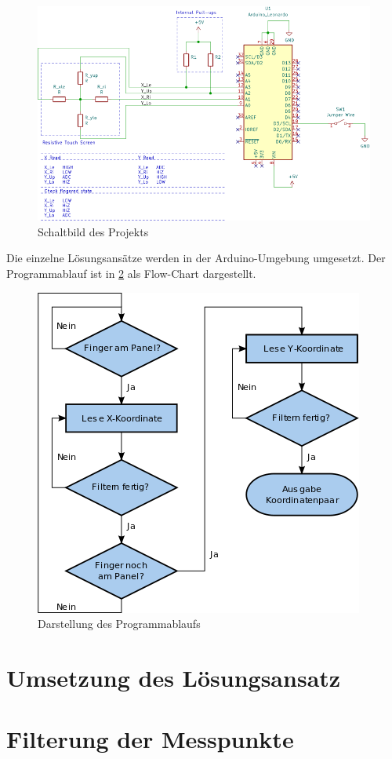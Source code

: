 \begin{figure}[ht!]
    \centering
    \includegraphics[width=\linewidth]{fig/schaltbild.png}
    \caption{Schaltbild des Projekts}
    \label{fig:schaltbild}
\end{figure}
Die einzelne Lösungsansätze werden in der Arduino-Umgebung umgesetzt.
Der Programmablauf ist in \cref{fig:flowchart} als Flow-Chart dargestellt.

\begin{figure}
    \centering
    \includegraphics[scale=0.45]{fig/flow_chart.png}
    \caption{Darstellung des Programmablaufs}
    \label{fig:flowchart}
\end{figure}
\section{Umsetzung des Lösungsansatz}
\section{Filterung der Messpunkte}